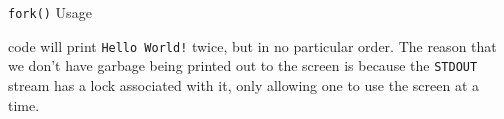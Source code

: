 \begin{listing}[h!tbp]
\caption{\texttt{fork()} Usage}
\label{lst:fork_Usage-1}
\end{listing}

 code will print \texttt{Hello World!} twice, but in no particular order.
The reason that we don't have garbage being printed out to the screen is because the \texttt{STDOUT} stream has a lock associated with it, only allowing one  to use the screen at a time.


